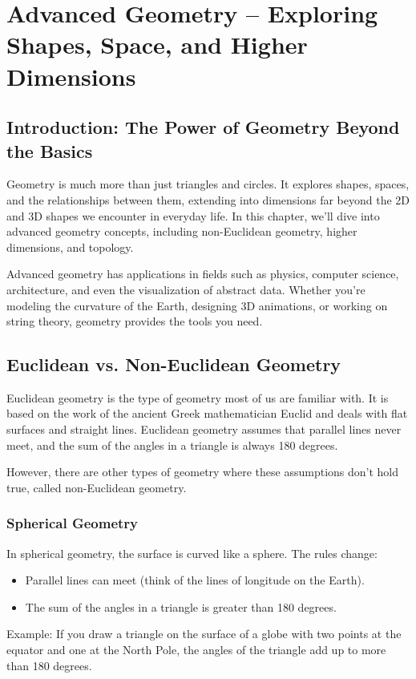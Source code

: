 \chapter{Advanced Geometry – Exploring Shapes, Space, and Higher Dimensions}

\section{Introduction: The Power of Geometry Beyond the Basics}
Geometry is much more than just triangles and circles. It explores shapes, spaces, and the relationships between them, extending into dimensions far beyond the 2D and 3D shapes we encounter in everyday life. In this chapter, we’ll dive into advanced geometry concepts, including non-Euclidean geometry, higher dimensions, and topology.

Advanced geometry has applications in fields such as physics, computer science, architecture, and even the visualization of abstract data. Whether you're modeling the curvature of the Earth, designing 3D animations, or working on string theory, geometry provides the tools you need.

\section{Euclidean vs. Non-Euclidean Geometry}
Euclidean geometry is the type of geometry most of us are familiar with. It is based on the work of the ancient Greek mathematician Euclid and deals with flat surfaces and straight lines. Euclidean geometry assumes that parallel lines never meet, and the sum of the angles in a triangle is always 180 degrees.

However, there are other types of geometry where these assumptions don’t hold true, called non-Euclidean geometry.

\subsection{Spherical Geometry}
In spherical geometry, the surface is curved like a sphere. The rules change:
\begin{itemize}
    \item Parallel lines can meet (think of the lines of longitude on the Earth).
    \item The sum of the angles in a triangle is greater than 180 degrees.
\end{itemize}
Example: If you draw a triangle on the surface of a globe with two points at the equator and one at the North Pole, the angles of the triangle add up to more than 180 degrees.

